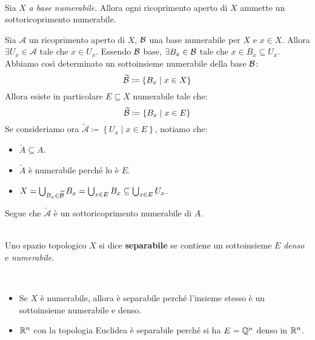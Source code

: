 \begin{proposition}~{}\\
Sia $X$ \textit{a base numerabile}. Allora ogni ricoprimento aperto di $X$ ammette un sottoricoprimento numerabile.
\end{proposition}
\begin{demonstration}
Sia $\mathcal{A}$ un ricoprimento aperto di $X$, $\mathcal{B}$ una base numerabile per $X$ e $x\in X$. Allora $\exists U_x\in\mathcal{A}$ tale che $x\in U_x$. Essendo $\mathcal{B}$ base, $\exists B_x\in\mathcal{B}$ tale che $x\in B_x\subseteq U_x$.\\
Abbiamo così determinato un sottoinsieme numerabile della base $\mathcal{B}$:
\begin{equation*}
\widetilde{\mathcal{B}}\coloneqq\left\{B_x\mid x\in X\right\}
\end{equation*}
Allora esiste in particolare $E\subseteq X$ numerabile tale che:
\begin{equation*}
\widetilde{\mathcal{B}}\coloneqq\left\{B_x\mid x\in E\right\}
\end{equation*}
Se consideriamo ora $\widetilde{\mathcal{A}}\coloneqq\left\{U_x\mid x\in E\right\}$, notiamo che:
\begin{itemize}
	\item $\widetilde{A}\subseteq A$.
	\item $\widetilde{A}$ è numerabile perché lo è $E$.
	\item $X=\mathop{{\bigcup}}\displaylimits_{B_x\in\widetilde{\mathcal{B}}}B_x=\mathop{{\bigcup}}\displaylimits_{x\in E}B_x\subseteq \mathop{{\bigcup}}\displaylimits_{x\in E}U_x $.
\end{itemize}
Segue che $\widetilde{\mathcal{A}}$ è un sottoricoprimento numerabile di $A$.
\end{demonstration}
\begin{define}~{}\\
Uno spazio topologico $X$ si dice \textbf{separabile} se contiene un sottoinsieme $E$ \textit{denso} e \textit{numerabile}.
\end{define}
\begin{examples}~{}
	\begin{itemize}
		\item Se $X$ è numerabile, allora è separabile perché l'insieme stesso è un sottoinsieme numerabile e denso.
		\item $\mathbb{R}^n$ con la topologia Euclidea è separabile perché si ha $E=\mathbb{Q}^n$ denso in $\mathbb{R}^n$.
	\end{itemize}
\vspace{-3mm}
\end{examples}
